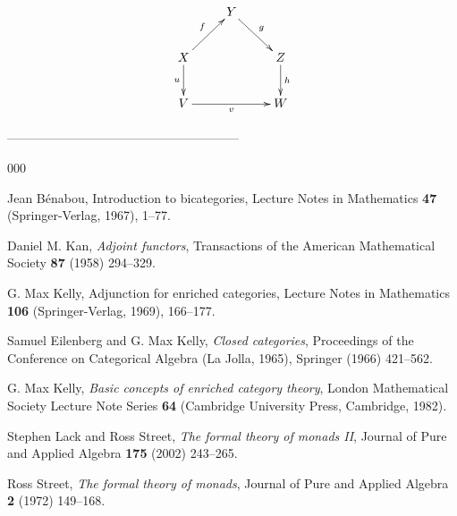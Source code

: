 \documentclass[a4paper,10pt]{article}
\numberwithin{equation}{section}
\begin{document}
\begin{equation}\xymatrix{
& Y \ar[rd]^-{ g}  & \\
X \ar[ru]^-{f} \ar[d]_-{u} & & Z \ar[d]^-{h} \\
V \ar[rr]_-{v} & & W 
}\end{equation}


\begin{center}
--------------------------------------------------------
\end{center}

\appendix
\begin{thebibliography}{000}

 Jean B\'enabou, Introduction to bicategories, Lecture Notes in Mathematics \textbf{47} (Springer-Verlag, 1967),
1--77.\label{Ben1967}

 Daniel M. Kan, \textit{Adjoint functors}, Transactions of the American Mathematical Society
\textbf{87} (1958) 294--329. \label{Kan1958}

 G. Max Kelly, Adjunction for enriched categories, Lecture Notes in Mathematics \textbf{106} (Springer-Verlag, 1969),
166--177.\label{Kelly1969}

 Samuel Eilenberg and G. Max Kelly, \textit{Closed categories}, Proceedings of the Conference on Categorical Algebra (La Jolla, 1965), Springer (1966) 421--562.\label{EilKel1966}

 G. Max Kelly, \textit{Basic concepts of enriched category theory}, London Mathematical Society Lecture Note Series \textbf{64} (Cambridge University Press, Cambridge, 1982). 

 Stephen Lack and Ross Street, \textit{The formal theory of monads II}, Journal of Pure and Applied Algebra \textbf{175} (2002) 243--265.\label{FTMII} 

 Ross Street, \textit{The formal theory of monads}, Journal of Pure and Applied Algebra \textbf{2} (1972) 149--168.\label{FTM} 

\end{thebibliography}
\end{document}
